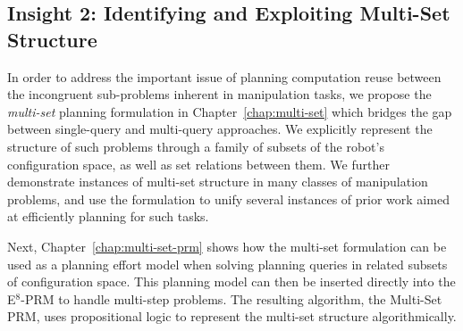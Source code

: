 
\subsection*{Insight 2: Identifying and Exploiting Multi-Set
   Structure}

In order to address the important issue of planning computation
reuse between the incongruent sub-problems inherent in manipulation
tasks,
we propose the \emph{multi-set} planning formulation
in Chapter~\ref{chap:multi-set}
which bridges the gap between single-query and multi-query approaches.
We explicitly represent the structure of such problems
through a family of subsets of the robot's configuration space,
as well as set relations between them.
We further demonstrate instances of multi-set structure
in many classes of manipulation problems,
and use the formulation to unify several instances of
prior work aimed at efficiently planning for such tasks.

Next, Chapter~\ref{chap:multi-set-prm}
shows how the multi-set formulation can be used as a
planning effort model
when solving planning queries in related subsets of configuration space.
This planning model can then be inserted directly into the 
E$^8$-PRM to handle multi-step problems.
The resulting algorithm,
the Multi-Set PRM,
uses propositional logic to represent the multi-set structure
algorithmically.

